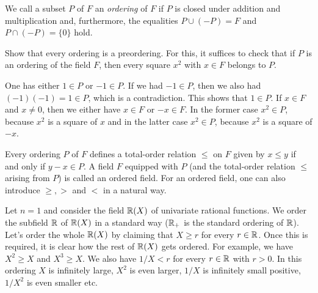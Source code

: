 We call a subset $P$ of $F$ an \emph{ordering} of $F$ if $P$ is closed under addition and multiplication and, furthermore, the equalities $P \cup (-P) = F$ and $P \cap (-P) = \{0\}$ hold. 

\begin{exercise}
	Show that every ordering is a preordering. For this, it suffices to check that if $P$ is an ordering of the field $F$, then every square $x^2$ with $x \in F$ belongs to $P$.
\end{exercise} 
\begin{solution}
	One has either $1 \in P$ or $-1 \in P$. If we had $-1 \in P$, then we also had $(-1) (-1) = 1 \in P$, which is a contradiction. This shows that $1 \in P$. If $x \in F$ and $x \ne 0$, then we either have $x \in F$ or $-x \in F$. In the former case $x^2 \in P$, because $x^2$ is a square of $x$ and in the latter case $x^2 \in P$, because $x^2$ is a square of $-x$. 
\end{solution}

Every ordering $P$ of $F$ defines a total-order relation $\le$ on $F$ given by $x \le y $ if and only if $y -x \in P$.  A field $F$ equipped with $P$ (and the total-order relation $\le$ arising from $P$) is called an ordered field. For an ordered field, one can also introduce $\ge, >$ and $<$ in a natural way. 

\begin{example}
	\label{ex:ordering:rational:functions}
	Let $n=1$ and consider the field $\mathbb{R}(X)$ of univariate rational functions. We order the subfield $\mathbb{R}$ of $\mathbb{R}(X)$ in a standard way ($\mathbb{R}_+$ is the standard ordering of $\mathbb{R}$). Let's order the whole $\mathbb{R}(X)$ by claiming that $X \ge r$ for every $r \in \mathbb{R}$. Once this is required, it is clear how the rest of $\mathbb{R}(X)$ gets ordered. For example, we have $X^2 \ge X$ and $X^3 \ge X$. We also have $1/X < r$ for every $r \in \mathbb{R}$ with $r > 0$. In this ordering $X$ is infinitely large, $X^2$ is even larger, $1/X$ is infinitely small positive, $1/X^2$ is even smaller etc. 
\end{example}

